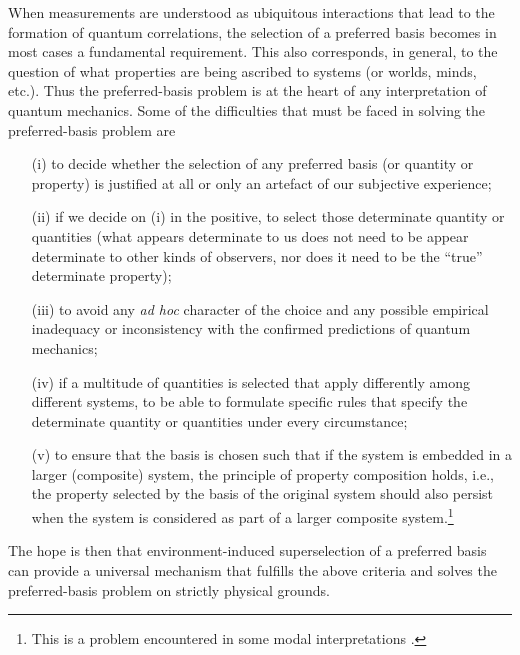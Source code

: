 \documentclass[rmp,aps,amsmath,amsfonts,noshowkeys,noshowpacs,12pt]{revtex4}
\begin{document}
When measurements are understood as ubiquitous interactions that lead
to the formation of quantum correlations, the selection of a preferred
basis becomes in most cases a fundamental requirement.  This also
corresponds, in general, to the question of what properties are being
ascribed to systems (or worlds, minds, etc.).  Thus the
preferred-basis problem is at the heart of any interpretation of
quantum mechanics. Some of the difficulties that must be faced in
solving the preferred-basis problem are 

\begin{enumerate}

\item[(i)] to decide whether the
selection of any preferred basis (or quantity or property) is
justified at all or only an artefact of our subjective experience;

\item[(ii)] if we decide on (i) in the positive, to select those determinate
quantity or quantities (what appears determinate to us does not
need to be appear determinate to other kinds of observers, nor does it
need to be the ``true'' determinate property); 

\item[(iii)] to avoid any \emph{ad hoc} character of the choice and
  any possible empirical inadequacy or inconsistency with the
  confirmed predictions of quantum mechanics;
  
\item[(iv)] if a multitude of quantities is selected that apply
  differently among different systems, to be able to formulate
  specific rules that specify the determinate quantity or quantities
  under every circumstance;
  
\item[(v)] to ensure that the basis is chosen such that if the system
  is embedded in a larger (composite) system, the principle of
  property composition holds, i.e., the property selected by the basis
  of the original system should also persist when the system is
  considered as part of a larger composite system.\footnote{This is a
    problem encountered in some modal interpretations
    \citep[see][]{Clifton:1996:op}.}

\end{enumerate}
  
The hope is then that environment-induced superselection of a
preferred basis can provide a universal mechanism that fulfills the
above criteria and solves the preferred-basis problem on strictly
physical grounds.
\end{document}
